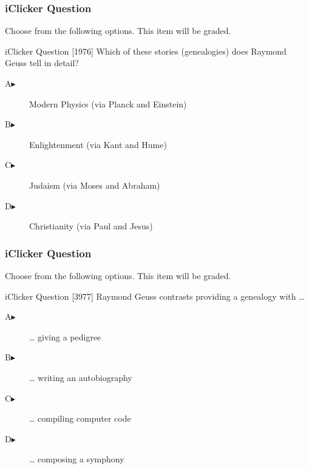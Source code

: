 \documentclass[xcolor=dvipsnames]{beamer}
\begin{document}
\begin{frame}
  \frametitle{iClicker Question}
Choose from the following options. This item will be graded.
\begin{block}{iClicker Question}
[1976] Which of these stories (genealogies) does Raymond Geuss tell in detail?
\end{block}
\begin{description}
\item[A\hspace{.2in}$\blacktriangleright$] Modern Physics (via Planck and Einstein)
\item[B\hspace{.2in}$\blacktriangleright$] Enlightenment (via Kant and Hume)
\item[C\hspace{.2in}$\blacktriangleright$] Judaism (via Moses and Abraham)
\item[D\hspace{.2in}$\blacktriangleright$] Christianity (via Paul and Jesus)
\end{description}
\end{frame}

\begin{frame}
  \frametitle{iClicker Question}
Choose from the following options. This item will be graded.
\begin{block}{iClicker Question}
[3977] Raymond Geuss contrasts providing a genealogy with {\ldots}
\end{block}
\begin{description}
\item[A\hspace{.2in}$\blacktriangleright$] {\ldots} giving a pedigree
\item[B\hspace{.2in}$\blacktriangleright$] {\ldots} writing an autobiography
\item[C\hspace{.2in}$\blacktriangleright$] {\ldots} compiling computer code
\item[D\hspace{.2in}$\blacktriangleright$] {\ldots} composing a symphony
\end{description}
\end{frame}
\end{document}
